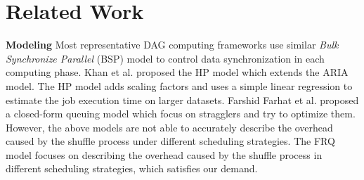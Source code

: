 \section{Related Work}

{\color{black}
\textbf{Modeling} 
Most representative DAG computing frameworks use similar \textit{Bulk Synchronize Parallel} (BSP)\cite{valiant1990bridging} model to control data synchronization in each computing phase. 
Khan et al. \cite{khan2016hadoop} proposed the HP model which extends the ARIA model. The HP model adds scaling factors and uses a simple linear regression to estimate the job execution time on larger datasets.
Farshid Farhat et al.\cite{farhat2016stochastic} proposed a closed-form queuing model which focus on stragglers and try to optimize them. 
However, the above models are not able to accurately describe the overhead caused by the shuffle process under different scheduling strategies. 
The FRQ model focuses on describing the overhead caused by the shuffle process in different scheduling strategies, which satisfies our demand.

}
